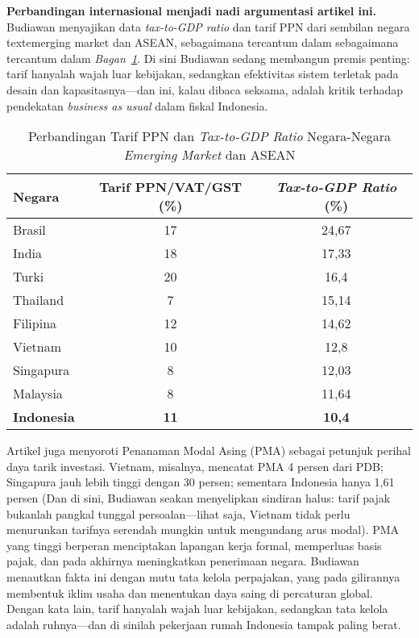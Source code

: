 \textbf{Perbandingan internasional menjadi nadi argumentasi artikel ini.} Budiawan menyajikan data \textit{tax-to-GDP ratio} dan tarif PPN dari sembilan negara text{emerging market dan ASEAN}, sebagaimana tercantum dalam sebagaimana tercantum dalam \textit{Bagan~\ref{tab:international_comparison}}. Di sini Budiawan sedang membangun premis penting: tarif hanyalah wajah luar kebijakan, sedangkan efektivitas sistem terletak pada desain dan kapasitasnya—dan ini, kalau dibaca seksama, adalah kritik terhadap pendekatan \textit{business as usual} dalam fiskal Indonesia.

\begin{table}[hbt!]
\caption{Perbandingan Tarif PPN dan \textit{Tax-to-GDP Ratio} Negara-Negara \textit{Emerging Market} dan ASEAN}
\label{tab:international_comparison}
\centering
\begin{tabular}{lcc}
\textbf{Negara} & \textbf{Tarif PPN/VAT/GST (\%)} & \textbf{\textit{Tax-to-GDP Ratio} (\%)} \\
\midrule
Brasil & 17 & 24,67 \\
India & 18 & 17,33 \\
Turki & 20 & 16,4 \\
Thailand & 7 & 15,14 \\
Filipina & 12 & 14,62 \\
Vietnam & 10 & 12,8 \\
Singapura & 8 & 12,03 \\
Malaysia & 8 & 11,64 \\
\textbf{Indonesia} & \textbf{11} & \textbf{10,4} \\
\end{tabular}
\end{table}

Artikel juga menyoroti Penanaman Modal Asing (PMA) sebagai petunjuk perihal daya tarik investasi. Vietnam, misalnya, mencatat PMA 4 persen dari PDB; Singapura jauh lebih tinggi dengan 30 persen; sementara Indonesia hanya 1,61 persen (Dan di sini, Budiawan seakan menyelipkan sindiran halus: tarif pajak bukanlah pangkal tunggal persoalan—lihat saja, Vietnam tidak perlu menurunkan tarifnya serendah mungkin untuk mengundang arus modal). PMA yang tinggi berperan menciptakan lapangan kerja formal, memperluas basis pajak, dan pada akhirnya meningkatkan penerimaan negara. Budiawan menautkan fakta ini dengan mutu tata kelola perpajakan, yang pada gilirannya membentuk iklim usaha dan menentukan daya saing di percaturan global. Dengan kata lain, tarif hanyalah wajah luar kebijakan, sedangkan tata kelola adalah ruhnya—dan di sinilah pekerjaan rumah Indonesia tampak paling berat.

